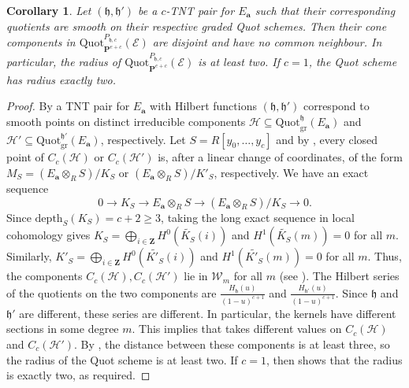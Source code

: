 \documentclass[leqno,11pt,a4paper]{amsart}
\newtheorem{cor}[cor]{Corollary}
\theoremstyle{definition}
\numberwithin{equation}{section}
\newcommand{\bfa}{\mathbf{a}}
\newcommand{\Quot}{\mathrm{Quot}}
\newcommand{\PP}{\mathbf{P}}
\newcommand{\mfh}{\mathfrak{h}}
\newcommand{\EE}{\mathscr{E}}
\newcommand{\HH}{\mathcal{H}}
\newcommand{\ZZ}{\mathbf{Z}}
\begin{document}
\begin{cor}\label{TNT_pair_cor}
Let $(\mfh,\mfh')$ be a $c$-TNT pair for $E_\bfa$ such that their corresponding quotients are smooth on their respective graded Quot schemes. 
Then their cone components in $\Quot^{P_{\mfh,c}}_{\PP^{e+c}}(\EE)$ are disjoint and have no common neighbour. 
In particular,  the radius of $\Quot^{P_{\mfh,c}}_{\PP^{e+c}}(\EE)$ is at least two.
If $c=1$, the Quot scheme has radius exactly two.
\end{cor}
\begin{proof} 
By  a TNT pair for $E_\bfa$ with Hilbert functions $(\mfh,\mfh')$ correspond to smooth points on distinct irreducible components $\HH \subseteq \Quot^{\mfh}_{\mathrm{gr}}(E_\bfa)$ and $\HH' \subseteq \Quot^{\mfh'}_{\mathrm{gr}}(E_\bfa)$, respectively. 
Let $S = R[y_0,\dots,y_c]$ and by , every closed point of  $C_c(\HH)$ or $C_c(\HH')$ is, after a linear change of coordinates, of the form $M_S = (E_\bfa \otimes_R S)/K_S $ or $(E_\bfa \otimes_R S)/K'_S$, respectively.
We have an exact sequence
$$
0 \to K_S \to E_\bfa\otimes_R S \to (E_\bfa\otimes_R S)/K_S \to 0.
$$
Since $\mathrm{depth}_S(K_S) = c+2 \geq 3$, taking the long exact sequence in local cohomology gives $K_S = \bigoplus_{i \in \ZZ}H^0(\widetilde{K_S}(i))$ and $H^1(\widetilde{K_S}(m)) = 0$ for all $m$. 
Similarly, $K'_S =\bigoplus_{i \in \ZZ} H^0(\widetilde{K'_S}(i))$ and $H^1(\widetilde{K'_S}(m)) = 0$ for all $m$. 
Thus, the components $C_c(\HH), C_c(\HH')$ lie in $\mathcal{W}_m$ for all $m$ (see ).
The Hilbert series of the quotients on the two components are $\frac{H_{\mfh}(u)}{(1-u)^{c+1}}$ and $\frac{H_{\mfh'}(u)}{(1-u)^{c+1}}$. 
Since $\mfh$ and $\mfh'$ are different, these series are different. 
In particular, the kernels have different sections in some degree $m$.
This implies that  takes different values on $C_c(\HH)$ and $C_c(\HH')$. 
By , the distance between these components is at least three, so the radius of the Quot scheme is at least two. 
If $c=1$, then  shows that the radius is exactly two, as required.
\end{proof}
\end{document}

